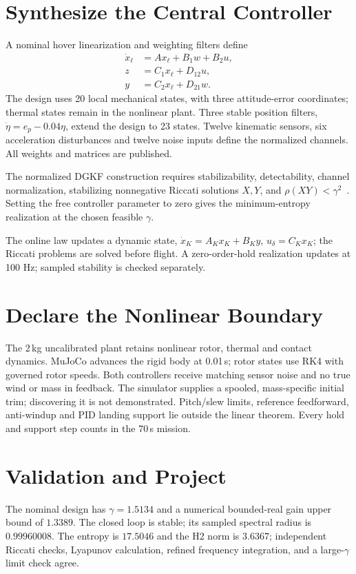\section{Synthesize the Central Controller}
A nominal hover linearization and weighting filters define
\begin{equation}
\begin{aligned}
\dot x_\ell&=Ax_\ell+B_1w+B_2u,\\
z&=C_1x_\ell+D_{12}u,\\
y&=C_2x_\ell+D_{21}w .
\end{aligned}
\end{equation}
The design uses 20 local mechanical states, with three attitude-error coordinates;
thermal states remain in the nonlinear plant. Three stable position filters, $\dot\eta=e_p-0.04\eta$, extend the design to 23 states. Twelve kinematic sensors, six acceleration disturbances and twelve noise inputs define the normalized channels. All weights and matrices are published.

The normalized DGKF construction requires stabilizability, detectability, channel
normalization, stabilizing nonnegative Riccati solutions $X,Y$, and
$\rho(XY)<\gamma^2$~\cite{dgkf1989}. Setting the free controller parameter to zero
gives the minimum-entropy realization at the chosen feasible $\gamma$.

The online law updates a dynamic state,
$\dot x_K=A_Kx_K+B_Ky$, $u_\delta=C_Kx_K$;
the Riccati problems are solved before flight. A zero-order-hold realization updates at 100 Hz; sampled stability is checked separately.

\section{Declare the Nonlinear Boundary}
The 2\,kg uncalibrated plant retains nonlinear rotor, thermal and contact
dynamics. MuJoCo advances the rigid body at 0.01\,s; rotor states use RK4
with governed rotor speeds.
Both controllers receive matching sensor noise and no true wind or mass in
feedback. The simulator supplies a spooled, mass-specific initial trim;
discovering it is not demonstrated. Pitch/slew limits, reference feedforward,
anti-windup and PID landing support lie outside the linear theorem.
Every hold and support step counts in the 70\,s mission.
\section{Validation and Project}
The nominal design has $\gamma=1.5134$ and a numerical bounded-real gain
upper bound of $1.3389$. The closed loop is stable; its sampled spectral radius
is $0.99960008$. The entropy is $17.5046$ and the H2 norm is $3.6367$;
independent Riccati checks, Lyapunov calculation, refined frequency integration,
and a large-$\gamma$ limit check agree. 

